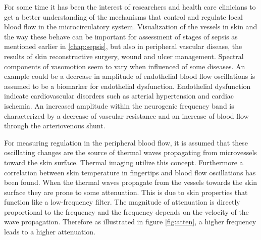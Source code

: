 \label{freq}

For some time it has been the interest of researchers and health care clinicians to get a better understanding of the mechanisms that control and regulate local blood flow in the microcirculatory system\cite{geyer2004,sagaidachnyi2014,sagaidachnyi2017,liu2012}. 
Visualization of the vessels in skin and the way these behave can be important for assessment of stages of sepsis as mentioned earlier in \cref{chap:sepsis}, but also in peripheral vascular disease, the results of skin reconstructive surgery, wound and ulcer management.\cite{kanta2014,liu2012}
Spectral components of vasomotion seem to vary when influenced of some diseases. An example could be a decrease in amplitude of endothelial blood flow oscillations is assumed to be a biomarker for endothelial dysfunction. Endothelial dysfunction indicate cardiovascular disorders such as arterial hypertension and cardiac ischemia. An increased amplitude within the neurogenic frequency band is characterized by a decrease of vascular resistance and an increase of blood flow through the arteriovenous shunt.\cite{sagaidachnyi2017}

For measuring regulation in the peripheral blood flow, it is assumed that these oscillating changes are the source of thermal waves propagating from microvessels toward the skin surface. Thermal imaging utilize this concept.\cite{sagaidachnyi2017}
Furthermore a correlation between skin temperature in fingertips and blood flow oscillations has been found\cite{sagaidachnyi2014}.
When the thermal waves propagate from the vessels towards the skin surface they are prone to some attenuation. This is due to skin properties that function like a low-frequency filter.\cite{podtaev2008}
The magnitude of attenuation is directly proportional to the frequency and the frequency depends on the velocity of the wave propagation\cite{sagaidachnyi2014}.
Therefore as illustrated in figure \ref{fig:atten}, a higher frequency leads to a higher attenuation.   

